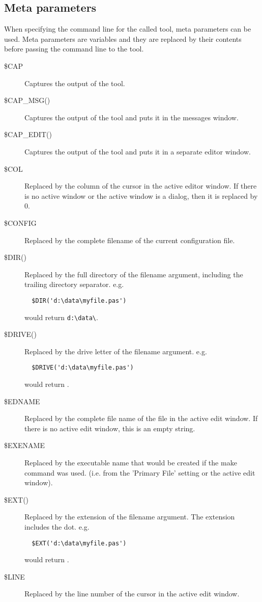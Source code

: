 \subsection{Meta parameters}
When specifying the command line for the called tool, meta parameters can
be used. Meta parameters are variables and they are replaced
by their contents before passing the command line to the tool.

\begin{description}
\item[\$CAP]
Captures the output of the tool.
\item[\$CAP\_MSG()]
Captures the output of the tool and puts it in the messages window.
\item[\$CAP\_EDIT()]
Captures the output of the tool and puts it in a separate editor window.
\item[\$COL]
Replaced by the column of the cursor in the active editor window. If there is no
 active window or the active window is a dialog, then it is replaced by 0.
\item[\$CONFIG]
Replaced by the complete filename of the current configuration file.
\item[\$DIR()]
Replaced by the full directory of the filename argument, including the trailing
directory separator. e.g.
\begin{verbatim}
  $DIR('d:\data\myfile.pas')
\end{verbatim}
would return \verb|d:\data\|.
\item[\$DRIVE()]
Replaced by the drive letter of the filename argument. e.g.
\begin{verbatim}
  $DRIVE('d:\data\myfile.pas')
\end{verbatim}
would return .
\item[\$EDNAME]
Replaced by the complete file name of the file in the active edit window.
If there is no active edit window, this is an empty string.
\item[\$EXENAME]
Replaced by the executable name that would be created if the make command
was used. (i.e. from the 'Primary File' setting or the active edit window).
\item[\$EXT()]
Replaced by the extension of the filename argument.
The extension includes the dot.
e.g.
\begin{verbatim}
  $EXT('d:\data\myfile.pas')
\end{verbatim}
would return .
\item[\$LINE]
Replaced by the line number of the cursor in the active edit window.

\end{description}
